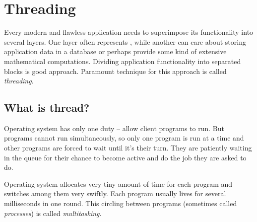 \section{Threading}\label{section:thread}
Every modern and flawless application needs to superimpose its functionality into several layers. One layer often represents , while another can care about storing application data in a database or perhaps provide some kind of extensive mathematical computations. Dividing application functionality into separated blocks is good approach. Paramount technique for this approach is called \textit{threading}.

\subsection{What is thread?}
Operating system has only one duty -- allow client programs to run. But programs cannot run simultaneously, so only one program is run at a time and other programs are forced to wait until it's their turn. They are patiently waiting in the queue for their chance to become active and do the job they are asked to do. 

Operating system allocates very tiny amount of time for each program and switches among them very swiftly. Each program usually lives for several milliseconds in one round. This circling between programs (sometimes called \textit{processes}) is called \textit{multitasking}.

